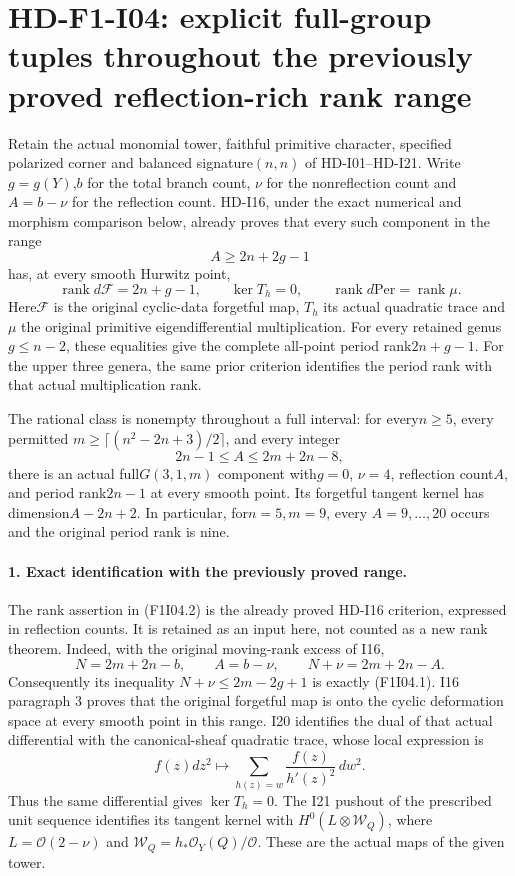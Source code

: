 \section[HD-F1-I04: uniform reflection-rich full-group tuples]{HD-F1-I04: explicit full-group tuples throughout the previously proved reflection-rich rank range}
\label{sec:f1-reflection-rich-full-rank}

Retain the actual monomial tower, faithful primitive character,
specified polarized corner and balanced signature$(n,n)$ of
HD-I01--HD-I21. Write$g=g(Y)$,$b$ for the total branch count,
$\nu$ for the nonreflection count and$A=b-\nu$ for the
reflection count. HD-I16, under the exact numerical and morphism comparison below, already proves that every such component in the range
\[
                 A\ge 2n+2g-1                         \tag{F1I04.1}
\]
has, at every smooth Hurwitz point,
\[
 \operatorname{rank}d\mathcal F=2n+g-1,
 \qquad \ker T_h=0,
 \qquad \operatorname{rank}d\mathrm{Per}
                        =\operatorname{rank}\mu.       \tag{F1I04.2}
\]
Here$\mathcal F$ is the original cyclic-data forgetful map,
$T_h$ its actual quadratic trace and$\mu$ the original
primitive eigendifferential multiplication. For every retained
genus$g\le n-2$, these equalities give the complete all-point
period rank$2n+g-1$. For the upper three genera, the same prior criterion identifies
the period rank with that actual multiplication rank.

The rational class is nonempty throughout a full interval:
for every$n\ge5$, every permitted
$m\ge\lceil(n^2-2n+3)/2\rceil$, and every integer
\[
           2n-1\le A\le 2m+2n-8,                    \tag{F1I04.3}
\]
there is an actual full$G(3,1,m)$ component with$g=0$,
$\nu=4$, reflection count$A$, and period rank$2n-1$
at every smooth point. Its forgetful tangent kernel has
dimension$A-2n+2$. In particular, for$n=5,m=9$, every
$A=9,\ldots,20$ occurs and the original period rank is nine.

\paragraph{1. Exact identification with the previously proved range.}
The rank assertion in (F1I04.2) is the already proved HD-I16
criterion, expressed in reflection counts. It is retained as
an input here, not counted as a new rank theorem.
Indeed, with the original moving-rank excess of I16,
\[
 N=2m+2n-b,\qquad A=b-\nu,\qquad
 N+\nu=2m+2n-A.
 \tag{F1I04.4}
\]
Consequently its inequality $N+\nu\le2m-2g+1$ is exactly
(F1I04.1). I16 paragraph 3 proves that the original
forgetful map is onto the cyclic deformation space at
every smooth point in this range. I20 identifies the dual
of that actual differential with the canonical-sheaf
quadratic trace, whose local expression is
\[
 f(z)dz^2\longmapsto
       \sum_{h(z)=w}\frac{f(z)}{h'(z)^2}\,dw^2.
 \tag{F1I04.5}
\]
Thus the same differential gives $\ker T_h=0$.
The I21 pushout of the prescribed unit sequence identifies
its tangent kernel with $H^0(L\otimes\mathcal W_Q)$,
where $L=\mathcal O(2-\nu)$ and
$\mathcal W_Q=h_*\mathcal O_Y(Q)/\mathcal O$.
These are the actual maps of the given tower.

